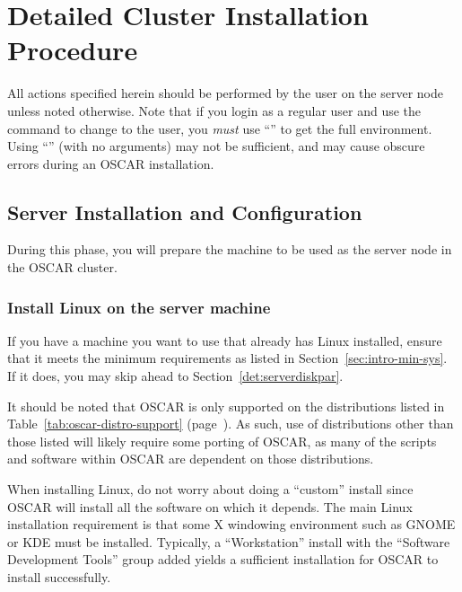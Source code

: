 %
%
%

\section{Detailed Cluster Installation Procedure}
\label{sec:detail}

All actions specified herein should be performed by the 
user on the server node unless noted otherwise.  Note that if you
login as a regular user and use the  command to change to the
 user, you {\em must} use ``'' to get the full
 environment.  Using ``'' (with no arguments) may
not be sufficient, and may cause obscure errors during an OSCAR
installation.


\subsection{Server Installation and Configuration}
\label{det:serverinstall}
  
During this phase, you will prepare the machine to be used as the
server node in the OSCAR cluster.


\subsubsection{Install Linux on the server machine} 
\label{det:serverosinstall}

If you have a machine you want to use that already has Linux
installed, ensure that it meets the minimum requirements as listed in
Section~\ref{sec:intro-min-sys}.  If it does, you may skip ahead to
Section~\ref{det:serverdiskpar}.

It should be noted that OSCAR is only supported on the distributions
listed in Table~\ref{tab:oscar-distro-support}
(page~\pageref{tab:oscar-distro-support}).  As such, use of
distributions other than those listed will likely require some porting
of OSCAR, as many of the scripts and software within OSCAR are
dependent on those distributions. 

When installing Linux, do not worry about doing a ``custom'' install
since OSCAR will install all the software on which it depends.  The
main Linux installation requirement is that some X windowing
environment such as GNOME or KDE must be installed.  Typically, a
``Workstation'' install with the ``Software Development Tools'' group
added yields a sufficient installation for OSCAR to install
successfully.

